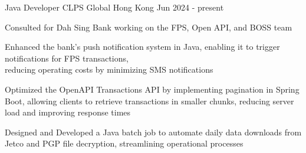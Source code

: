 
\begin{cventries}

  \cventry
  {Java Developer}
  {CLPS Global}
  {Hong Kong}
  {Jun 2024 - present}
  {
    \begin{cvitems}
      \item {Consulted for Dah Sing Bank working on the FPS, Open API, and BOSS team}
      \item {Enhanced the bank's push notification system in Java, enabling it to trigger notifications for FPS transactions, \\reducing operating costs by minimizing SMS notifications}
      \item {Optimized the OpenAPI Transactions API by implementing pagination in Spring Boot, allowing clients to retrieve transactions in smaller chunks, reducing server load and improving response times}
      \item {Designed and Developed a Java batch job to automate daily data downloads from Jetco and PGP file decryption, streamlining operational processes}
    \end{cvitems}
  }


\end{cventries}
